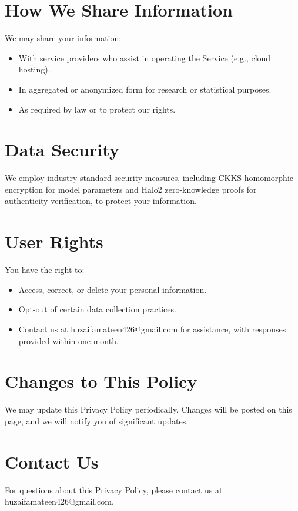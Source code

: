 \documentclass[12pt]{article}
\begin{document}
\section*{How We Share Information}
We may share your information:
\begin{itemize}
    \item With service providers who assist in operating the Service (e.g., cloud hosting).
    \item In aggregated or anonymized form for research or statistical purposes.
    \item As required by law or to protect our rights.
\end{itemize}

\section*{Data Security}
We employ industry-standard security measures, including CKKS homomorphic encryption for model parameters and Halo2 zero-knowledge proofs for authenticity verification, to protect your information.

\section*{User Rights}
You have the right to:
\begin{itemize}
    \item Access, correct, or delete your personal information.
    \item Opt-out of certain data collection practices.
    \item Contact us at huzaifamateen426@gmail.com for assistance, with responses provided within one month.
\end{itemize}

\section*{Changes to This Policy}
We may update this Privacy Policy periodically. Changes will be posted on this page, and we will notify you of significant updates.

\section*{Contact Us}
For questions about this Privacy Policy, please contact us at huzaifamateen426@gmail.com.
\end{document}
